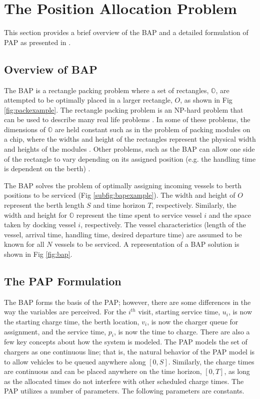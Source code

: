 \section{The Position Allocation Problem}
\label{sec:positionallocationproblem}
This section provides a brief overview of the BAP and a detailed formulation of PAP as presented in \cite{Qarebagh2019}.

\subsection{Overview of BAP}
The BAP is a rectangle packing problem where a set of rectangles, $\mathbb{O}$, are attempted to be optimally placed in
a larger rectangle, $O$, as shown in Fig \ref{fig:packexample}. The rectangle packing problem is an NP-hard problem that
can be used to describe many real life problems \cite{Bruin2013,Murata1995}. In some of these problems, the dimensions
of $\mathbb{O}$ are held constant such as in the problem of packing modules on a chip, where the widths and height of
the rectangles represent the physical width and heights of the modules \cite{Murata1995}. Other problems, such as the
BAP can allow one side of the rectangle to vary depending on its assigned position (e.g. the handling time is dependent
on the berth) \cite{Buhrkal2010}.

The BAP solves the problem of optimally assigning incoming vessels to berth positions to be serviced (Fig
\ref{subfig:bapexample}). The width and height of $O$ represent the berth length $S$ and time horizon $T$, respectively.
Similarly, the width and height for $\mathbb{O}$ represent the time spent to service vessel $i$ and the space taken by
docking vessel $i$, respectively. The vessel characteristics (length of the vessel, arrival time, handling time, desired
departure time) are assumed to be known for all $N$ vessels to be serviced. A representation of a BAP solution is shown
in Fig \ref{fig:bap}.

\subsection{The PAP Formulation}
The BAP forms the basis of the PAP; however, there are some differences in the way the variables are perceived. For the
$i^{th}$ visit, starting service time, $u_i$, is now the starting charge time, the berth location, $v_i$, is now the
charger queue for assignment, and the service time, $p_i$, is now the time to charge. There are also a few key concepts
about how the system is modeled. The PAP models the set of chargers as one continuous line; that is, the natural
behavior of the PAP model is to allow vehicles to be queued anywhere along $[0,S]$. Similarly, the charge times are
continuous and can be placed anywhere on the time horizon, $[0,T]$, as long as the allocated times do not interfere with
other scheduled charge times. The PAP utilizes a number of parameters. The following parameters are constants.

